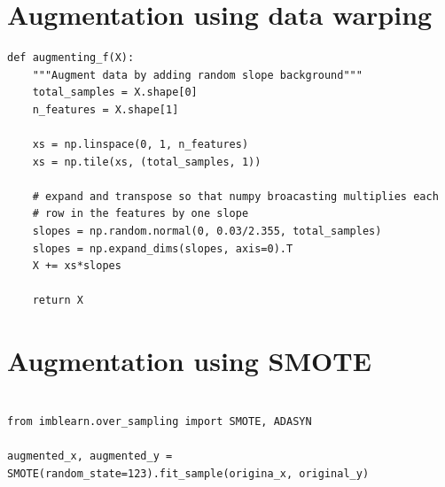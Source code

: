 












\chapter{Augmentation using data warping}
\label{chapter:first-appendix}
\lstset{language=Python, caption=Function to create data warping, label=Simple data warping}
\begin{lstlisting}[backgroundcolor = \color{white}]
def augmenting_f(X):
	"""Augment data by adding random slope background"""
	total_samples = X.shape[0]
	n_features = X.shape[1]
	
	xs = np.linspace(0, 1, n_features)
	xs = np.tile(xs, (total_samples, 1))
	
	# expand and transpose so that numpy broacasting multiplies each
	# row in the features by one slope
	slopes = np.random.normal(0, 0.03/2.355, total_samples)
	slopes = np.expand_dims(slopes, axis=0).T
	X += xs*slopes
	
	return X
\end{lstlisting}

\chapter{Augmentation using SMOTE}
\label{chapter:second-appendix}
\lstset{language=Python, caption=Implimentation of SMOTE, label=Simple data augmentation}
\begin{lstlisting}[backgroundcolor = \color{white}]

from imblearn.over_sampling import SMOTE, ADASYN

augmented_x, augmented_y = SMOTE(random_state=123).fit_sample(origina_x, original_y)

\end{lstlisting}

